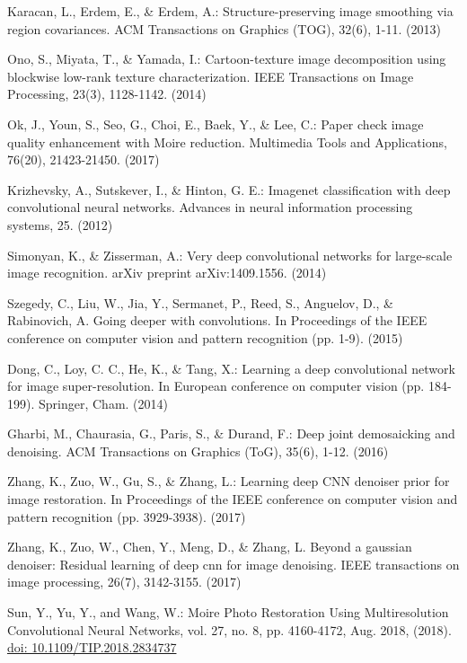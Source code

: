 \documentclass[10pt,letterpaper]{article}
\begin{document}
\begin{thebibliography}{0}
Karacan, L., Erdem, E., \& Erdem, A.: Structure-preserving image smoothing via region covariances. ACM Transactions on Graphics (TOG), 32(6), 1-11. (2013)

Ono, S., Miyata, T., \& Yamada, I.: Cartoon-texture image decomposition using blockwise low-rank texture characterization. IEEE Transactions on Image Processing, 23(3), 1128-1142. (2014)

Ok, J., Youn, S., Seo, G., Choi, E., Baek, Y., \& Lee, C.: Paper check image quality enhancement with Moire reduction. Multimedia Tools and Applications, 76(20), 21423-21450. (2017)

Krizhevsky, A., Sutskever, I., \& Hinton, G. E.: Imagenet classification with deep convolutional neural networks. Advances in neural information processing systems, 25. (2012)

Simonyan, K., \& Zisserman, A.: Very deep convolutional networks for large-scale image recognition. arXiv preprint arXiv:1409.1556. (2014)

Szegedy, C., Liu, W., Jia, Y., Sermanet, P., Reed, S., Anguelov, D., \& Rabinovich, A. Going deeper with convolutions. In Proceedings of the IEEE conference on computer vision and pattern recognition (pp. 1-9). (2015)

Dong, C., Loy, C. C., He, K., \& Tang, X.: Learning a deep convolutional network for image super-resolution. In European conference on computer vision (pp. 184-199). Springer, Cham. (2014)

Gharbi, M., Chaurasia, G., Paris, S., \& Durand, F.: Deep joint demosaicking and denoising. ACM Transactions on Graphics (ToG), 35(6), 1-12. (2016)

Zhang, K., Zuo, W., Gu, S., \& Zhang, L.: Learning deep CNN denoiser prior for image restoration. In Proceedings of the IEEE conference on computer vision and pattern recognition (pp. 3929-3938). (2017)

Zhang, K., Zuo, W., Chen, Y., Meng, D., \& Zhang, L. Beyond a gaussian denoiser: Residual learning of deep cnn for image denoising. IEEE transactions on image processing, 26(7), 3142-3155. (2017)

Sun, Y., Yu, Y., and Wang, W.: Moire Photo Restoration Using Multiresolution Convolutional Neural Networks, vol. 27, no. 8, pp. 4160-4172, Aug. 2018, (2018). \url{doi: 10.1109/TIP.2018.2834737}


\end{thebibliography}
\end{document}
